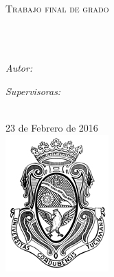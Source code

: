 \documentclass[
11pt, %
oneside, %
english, %
doublespacing, %
nolistspacing, %
parskip, %
parident,
headsepline, %
]{MastersDoctoralThesis} %
\author{Luis \textsc{Thur}} %
\begin{document}
\frontmatter %

\pagestyle{plain} %


\begin{titlepage}
\begin{center}
{\scshape\LARGE \univname \\ \facname \par}\vspace{1cm} %
\textsc{\large Trabajo final de grado}\\[0.5cm] %

\HRule \\[0.4cm] %
{\huge \bfseries \ttitle\par}\vspace{0.4cm} %
\HRule \\[0.4cm] %
 
\begin{minipage}[t]{0.4\textwidth}
\begin{flushleft} \large
\emph{Autor:}\\
\authorname %
\end{flushleft}
\end{minipage}
\begin{minipage}[t]{0.4\textwidth}
\begin{flushright} \large
\emph{Supervisoras:} \\
\supname
\end{flushright}
\end{minipage}\\[1cm]
{23 de Febrero de 2016}\\[0.5cm] %
\includegraphics{figures/logo.jpg} %
 
\vfill
\end{center}
\end{titlepage}
\end{document}
